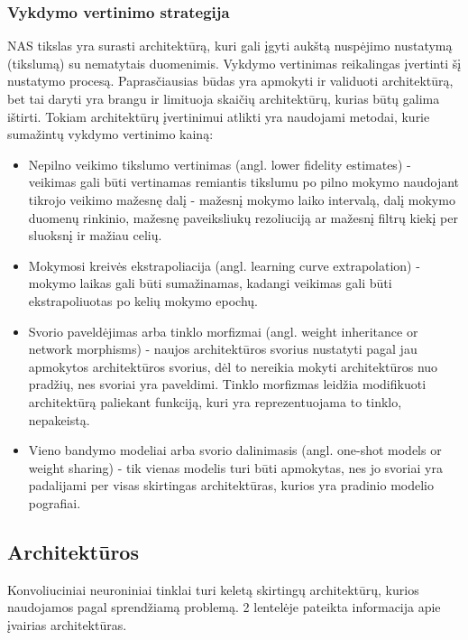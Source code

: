 \documentclass{VUMIFPSbakalaurinis}
\begin{document}
\subsubsection{Vykdymo vertinimo strategija}

NAS tikslas yra surasti architektūrą, kuri gali įgyti aukštą nuspėjimo nustatymą (tikslumą) su nematytais duomenimis. Vykdymo vertinimas reikalingas įvertinti šį nustatymo procesą. Paprasčiausias būdas yra apmokyti ir validuoti architektūrą, bet tai daryti yra brangu ir limituoja skaičių architektūrų, kurias būtų galima ištirti. 
Tokiam architektūrų įvertinimui atlikti yra naudojami metodai, kurie sumažintų vykdymo vertinimo kainą:
\begin{itemize}
    \item Nepilno veikimo tikslumo vertinimas (angl. lower fidelity estimates) - veikimas gali būti vertinamas remiantis tikslumu po pilno mokymo naudojant tikrojo veikimo mažesnę dalį - mažesnį mokymo laiko intervalą, dalį mokymo duomenų rinkinio, mažesnę paveiksliukų rezoliuciją ar mažesnį filtrų kiekį per sluoksnį ir mažiau celių. 
    \item Mokymosi kreivės ekstrapoliacija (angl. learning curve extrapolation) - mokymo laikas gali būti sumažinamas, kadangi veikimas gali būti ekstrapoliuotas po kelių mokymo epochų.
    \item Svorio paveldėjimas arba tinklo morfizmai (angl. weight inheritance or network morphisms) - naujos architektūros svorius nustatyti pagal jau apmokytos architektūros svorius, dėl to nereikia mokyti architektūros nuo pradžių, nes svoriai yra paveldimi. Tinklo morfizmas leidžia modifikuoti architektūrą paliekant funkciją, kuri yra reprezentuojama to tinklo, nepakeistą.
    \item Vieno bandymo modeliai arba svorio dalinimasis (angl. one-shot models or weight sharing) - tik vienas modelis turi būti apmokytas, nes jo svoriai yra padalijami per visas skirtingas architektūras, kurios yra pradinio modelio pografiai.
\end{itemize}

\subsection{Architektūros}
Konvoliuciniai neuroniniai tinklai turi keletą skirtingų architektūrų, kurios naudojamos pagal sprendžiamą problemą. 2 lentelėje pateikta informacija 
apie įvairias architektūras.
\end{document}
